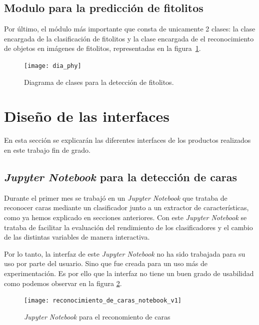 \subsection{Modulo para la predicción de fitolitos}

Por último, el módulo más importante que consta de unicamente 2 clases: la clase encargada de la clasificación de fitolitos y la clase encargada de el reconocimiento de objetos en imágenes de fitolitos, representadas en la figura~\ref{fig:C.4.7}.

\begin{figure}
\centering
\texttt{[image: dia\_phy]}
\caption{Diagrama de clases para la detección de fitolitos.}
\label{fig:C.4.7}
\end{figure}

\section{Diseño de las interfaces}

En esta sección se explicarán las diferentes interfaces de los productos realizados en este trabajo fin de grado.

\subsection{\textit{Jupyter Notebook} para la detección de caras}

Durante el primer mes se trabajó en un \textit{Jupyter Notebook} que trataba de reconocer caras mediante un clasificador junto a un extractor de características, como ya hemos explicado en secciones anteriores. Con este \textit{Jupyter Notebook} se trataba de facilitar la evaluación del rendimiento de los clasificadores y el cambio de las distintas variables de manera interactiva. 

Por lo tanto, la interfaz de este \textit{Jupyter Notebook} no ha sido trabajada para su uso por parte del usuario. Sino que fue creada para un uso más de experimentación. Es por ello que la interfaz no tiene un buen grado de usabilidad como podemos observar en la figura \ref{fig:C.5.1}.

\begin{figure}
\centering
\texttt{[image: reconocimiento\_de\_caras\_notebook\_v1]}
\caption{\textit{Jupyter Notebook} para el reconomiento de caras}
\label{fig:C.5.1}
\end{figure}

